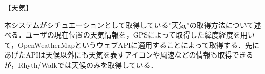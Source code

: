 【天気】
\par
本システムがシチュエーションとして取得している”天気”の取得方法について述べる．ユーザの現在位置の天気情報を，GPSによって取得した緯度経度を用いて，OpenWeatherMapというウェブAPIに適用することによって取得する．先にあげたAPIは天候以外にも天気を表すアイコンや風速などの情報も取得できるが，Rhyth/Walkでは天候のみを取得している．
